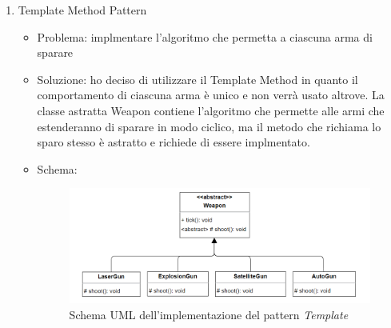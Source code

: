 \documentclass[a4paper,12pt]{report}
\begin{document}
\begin{enumerate}
\begin{itemize}
	\end{itemize}
	\item Template Method Pattern
	\begin{itemize}
		\item Problema: implmentare l'algoritmo che permetta a ciascuna arma di sparare
		\item Soluzione: ho deciso di utilizzare il Template Method in quanto il comportamento di ciascuna arma è unico e non verrà usato altrove.
		La classe astratta Weapon contiene l'algoritmo che permette alle armi che estenderanno di sparare in modo ciclico, ma il metodo che richiama lo sparo stesso è astratto e richiede di essere implmentato.
		\item Schema:
		\begin{figure}[H]
			\centering{}
			\includegraphics[width=\textwidth]{img/template.png}
			\caption{Schema UML dell'implementazione del pattern \emph{Template}}
			\label{img:Template Pattern}
		\end{figure}
	\end{itemize}
	
	
	
\end{enumerate}
%
\end{document}
